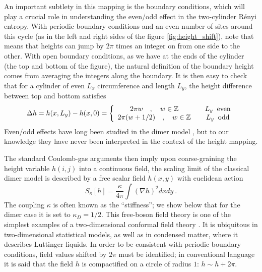\documentclass[11pt]{iopart}
\begin{document}
An important subtlety in this mapping is the boundary conditions, which will play a crucial role in understanding the even/odd effect in the two-cylinder R\'enyi entropy.
With periodic boundary conditions and an even number of sites around this cycle (as in the left and right sides of the figure \ref{fig:height_shift}), note that means that heights can jump by $2\pi$ times an integer on from one side to the other. 
With open boundary conditions, as we have at the ends of the cylinder (the top and bottom of the figure), the natural definition of the boundary height comes from averaging the integers along the boundary. 
It is then easy to check that for a cylinder of even $L_x$ circumference and length $L_y$,  the height difference between top and bottom satisfies
\begin{equation}
 \Delta h=h(x,L_y)-h(x,0)=\left\{
 \begin{array}{ccc}
  2\pi w \quad,\quad w\in \mathbb{Z}&&L_y \;\;{\rm even}\\
  2\pi (w+1/2) \quad,\quad w\in \mathbb{Z}&&L_y \;\;{\rm odd}
 \end{array}
 \right.
\end{equation}
Even/odd effects have long been studied in the dimer model \cite{Ferdinand,Dimers_all,Ruelledimers}, but to our knowledge they have never been interpreted in the context of the height mapping. 
 
The standard Coulomb-gas arguments \cite{Nienhuis} then imply upon coarse-graining the height variable $h(i,j)$ into a continuous field, the scaling limit of the classical dimer model is described by a free scalar field $h(x,y)$ with euclidean action
 \begin{equation}\label{eq:free_field_bis}
  S_\kappa[h]=\frac{\kappa}{4\pi}\int \left(\nabla h\right)^2 dx dy\ .
 \end{equation}
The coupling $\kappa$ is often known as the ``stiffness''; we show below that for the dimer case it is set to $\kappa_D=1/2$. This free-boson field theory is one of the simplest examples of a two-dimensional conformal field theory \cite{Ginsparg}. It is ubiquitous in two-dimensional statistical models, as well as in condensed matter, where it describes Luttinger liquids.  In order to be consistent with periodic boundary conditions, field values shifted by $2\pi$ must be identified; in conventional language it is said that the field $h$ is compactified on a circle of radius $1$: $h\sim h+2\pi$. 
\end{document}
